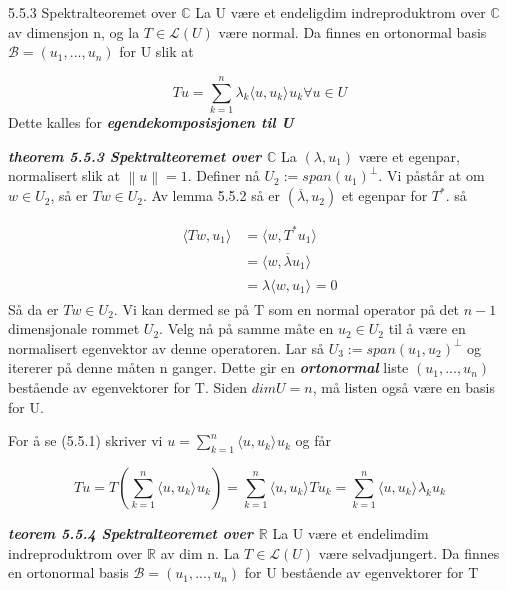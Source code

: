 \documentclass[a4paper,norsk]{article}
\begin{document}
\begin{theorembox}{5.5.3 Spektralteoremet over $ \mathbb{C} $ }{}
La U være et endeligdim indreproduktrom over $\mathbb{C} $ av dimensjon n, og la $ T \in \mathcal{L}(U) $ være normal. Da finnes en ortonormal basis $ \mathcal{B} = \left( u_1, ..., u_n \right)  $ for U slik at 

\[
    Tu = \sum_{ k=1 }^{ n } \lambda _k \langle u, u_k \rangle_{  } u_k \forall u \in U
\]
Dette kalles for \textbf{\textit{egendekomposisjonen til U}}
\end{theorembox}

\begin{proofbox}{\textbf{\textit{theorem 5.5.3 Spektralteoremet over $\mathbb{C}$}}}{}
La $ \left( \lambda , u_1 \right)  $ være et egenpar, normalisert slik at $ \left\lVert u \right\rVert=1  $. Definer nå $ U_2 := span \left( u_1 \right)^{\bot}  $. Vi påstår at om $ w \in U_2 $, så er $ Tw \in U_2 $. Av lemma 5.5.2 så er $ \left( \overline{ \lambda }, u_2 \right)  $ et egenpar for $ T^* $. så 

\begin{align*}
    \langle Tw, u_1 \rangle_{  } &= \langle w, T^*u_1 \rangle_{  } \\
    &= \langle w, \overline{ \lambda }u_1 \rangle_{  } \\
    &= \lambda \langle w, u_1 \rangle_{  } =0
\end{align*}
Så da er $ Tw \in U_2 $. Vi kan dermed se på T som en normal operator på det $ n-1 $  dimensjonale rommet $ U_2 $. Velg nå på samme måte en $ u_2 \in U_2 $ til å være en normalisert egenvektor av denne operatoren. Lar så $ U_3 := span \left( u_1, u_2  \right)^{\bot}  $ og itererer på denne måten n ganger. Dette gir en \textbf{\textit{ortonormal}} liste $ \left( u_1, ..., u_n \right)  $ bestående av egenvektorer for T. Siden $ dimU=n $, må listen også være en basis for U.

For å se (5.5.1) skriver vi $ u = \sum_{ k=1 }^{ n } \langle u, u_k \rangle_{  } u_k $ og får

\[
    Tu = T \left( \sum_{ k=1 }^{ n } \langle u, u_k \rangle_{  } u_k \right) = \sum_{ k=1 }^{ n } \langle u, u_k \rangle_{  } Tu_k = \sum_{ k=1 }^{ n } \langle u, u_k \rangle_{  } \lambda _k u_k
\]
\end{proofbox}


\begin{theorembox}{\textbf{\textit{teorem 5.5.4 Spektralteoremet over $\mathbb{R}$}}}{}
La U være et endelimdim indreproduktrom over $ \mathbb{R} $ av dim n. La $ T \in \mathcal{L}(U) $ være selvadjungert. Da finnes en ortonormal basis $ \mathcal{B} = \left( u_1, ..., u_n \right)  $ for U bestående av egenvektorer for T
\end{theorembox}
\end{document}
